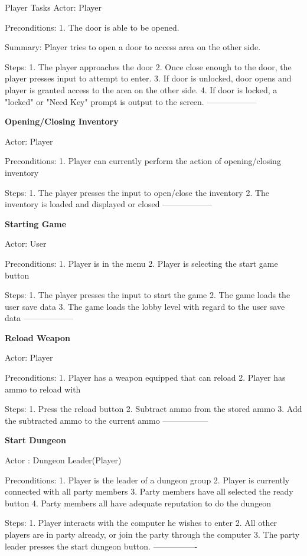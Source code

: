 \documentclass[12pt]{report}
\begin{document}
\begin {section}{Player Tasks}
Actor: Player

Preconditions:
1. The door is able to be opened.

Summary: Player tries to open a door to access area on the other side. 

Steps:
1. The player approaches the door
2. Once close enough to the door, the player presses input to attempt to enter.
3. If door is unlocked, door opens and player is granted access to the area on the other side.
4. If door is locked, a "locked" or "Need Key" prompt is output to the screen.
------------------

\textbf{Opening/Closing Inventory} %

Actor: Player

Preconditions: 
1. Player can currently perform the action of opening/closing inventory

Steps:
1. The player presses the input to open/close the inventory
2. The inventory is loaded and displayed or closed 
------------------

\textbf{Starting Game} %

Actor: User

Preconditions: 
1. Player is in the menu
2. Player is selecting the start game button

Steps:
1. The player presses the input to start the game
2. The game loads the user save data
3. The game loads the lobby level with regard to the user save data
------------------

\textbf{Reload Weapon} %

Actor: Player

Preconditions: 
1. Player has a weapon equipped that can reload
2. Player has ammo to reload with

Steps:
1. Press the reload button
2. Subtract ammo from the stored ammo
3. Add the subtracted ammo to the current ammo
-----------------

\textbf{Start Dungeon} %

Actor : Dungeon Leader(Player)

Preconditions:
1. Player is the leader of a dungeon group
2. Player is currently connected with all party members
3. Party members have all selected the ready button
4. Party members all have adequate reputation to do the dungeon

Steps:
1. Player interacts with the computer he wishes to enter
2. All other players are in party already, or join the party through the computer
3. The party leader presses the start dungeon button.
----------------


\end{section}
\end{document}
